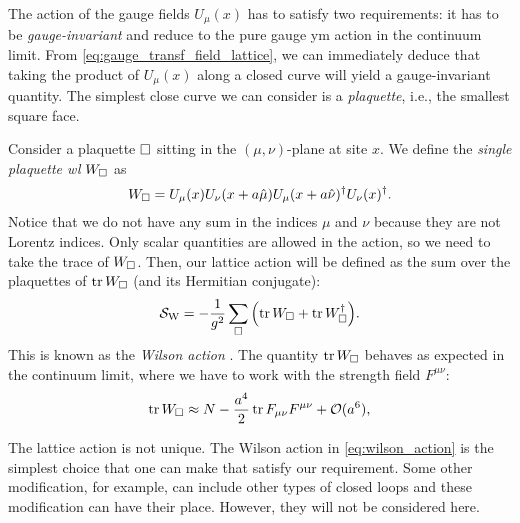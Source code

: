 The action of the gauge fields $U_{\mu}(x)$ has to satisfy two requirements:
it has to be \emph{gauge-invariant} and reduce to the pure gauge \ac{ym} action in the continuum limit.
From \eqref{eq:gauge_transf_field_lattice}, we can immediately deduce that taking the product of $U_{\mu}(x)$ along a closed curve will yield a gauge-invariant quantity.
The simplest close curve we can consider is a \emph{plaquette}, i.e., the smallest square face.

Consider a plaquette $\square$ sitting in the $(\mu, \nu)$-plane at site $x$.
We define the \emph{single plaquette \acl{wl}} $W_{\square}$ as
\begin{equation}
    W_{\square} =
    U_{\mu}(x) U_{\nu}(x + a \hat{\mu}) U_{\mu}(x + a \hat{\nu})^{\dagger} U_{\nu}(x)^{\dagger}.
    \label{eq:single_plaquette_Wilson_loop}
\end{equation}
Notice that we do not have any sum in the indices $\mu$ and $\nu$ because they are not Lorentz indices.
Only scalar quantities are allowed in the action, so we need to take the trace of $W_{\square}$.
Then, our lattice action will be defined as the sum over the plaquettes of $\tr W_{\square}$ (and its Hermitian conjugate):
\begin{equation}
    \mathcal{S}_{\text{W}} = - \frac{1}{g^2} \sum_{\square} \qty( \tr W_{\square} + \tr W_{\square}^{\dagger} ).
    \label{eq:wilson_action}
\end{equation}
This is known as the \emph{Wilson action} \citneeded.
The quantity $\tr W_{\square}$ behaves as expected in the continuum limit, where we have to work with the strength field $F^{\mu \nu}$:
\begin{equation}
    \tr W_{\square} \approx N - \frac{a^{4}}{2} \tr F_{\mu \nu} F^{\mu \nu} + \mathcal{O}(a^6),
\end{equation}

The lattice action is not unique.
The Wilson action in \eqref{eq:wilson_action} is the simplest choice that one can make that satisfy our requirement.
Some other modification, for example, can include other types of closed loops and these modification can have their place.
However, they will not be considered here.

